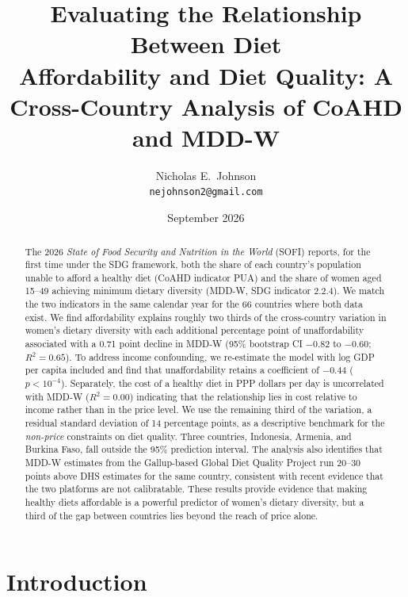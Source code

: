 \documentclass[11pt]{article}
\title{\Large\bfseries Evaluating the Relationship Between Diet \\ Affordability and Diet Quality: A Cross-Country Analysis of CoAHD and MDD-W}
\author{Nicholas E.\ Johnson \\ \small \texttt{nejohnson2@gmail.com}}
\date{September 2026}
\begin{document}
\maketitle

\begin{abstract}
\noindent
The 2026 \emph{State of Food Security and Nutrition in the World} (SOFI) reports, for the first time under the SDG framework, both the share of each country's population unable to afford a healthy diet (CoAHD indicator PUA) and the share of women aged 15--49 achieving minimum dietary diversity (MDD-W, SDG indicator 2.2.4). We match the two indicators in the same calendar year for the 66 countries where both data exist.  We find affordability explains roughly two thirds of the cross-country variation in women's dietary diversity with each additional percentage point of unaffordability associated with a 0.71  point decline in MDD-W (95\% bootstrap CI $-0.82$ to $-0.60$; $R^2=0.65$). To address income confounding, we re-estimate the model with log GDP per capita included and find that unaffordability retains a coefficient of $-0.44$ ($p<10^{-4}$). Separately, the cost of a healthy diet in PPP dollars per day is uncorrelated with MDD-W ($R^2=0.00$) indicating that the relationship lies in cost relative to income rather than in the price level.  We use the remaining third of the variation, a residual standard deviation of 14 percentage points, as a descriptive benchmark for the \emph{non-price} constraints on diet quality. Three countries, Indonesia, Armenia, and Burkina Faso, fall outside the 95\% prediction interval. The analysis also identifies that MDD-W estimates from the Gallup-based Global Diet Quality Project run 20--30 points above DHS estimates for the same country, consistent with recent evidence that the two platforms are not calibratable. These results provide evidence that making healthy diets affordable is a powerful predictor of women's dietary diversity, but a third of the gap between countries lies beyond the reach of price alone.
\end{abstract}

\section{Introduction}\label{sec:intro}
\end{document}
